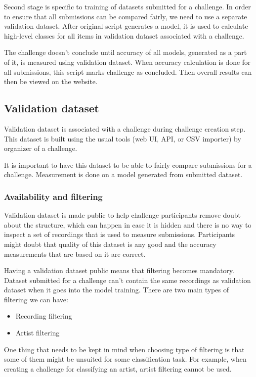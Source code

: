 Second stage is specific to training of datasets submitted for a challenge. In order to ensure that all submissions can be compared fairly, we need to use a separate validation dataset. After original script generates a model, it is used to calculate high-level classes for all items in validation dataset associated with a challenge.

The challenge doesn't conclude until accuracy of all models, generated as a part of it, is measured using validation dataset. When accuracy calculation is done for all submissions, this script marks challenge as concluded. Then overall results can then be viewed on the website.

\subsection{Validation dataset}

Validation dataset is associated with a challenge during challenge creation step. This dataset is built using the usual tools (web UI, API, or CSV importer) by organizer of a challenge.

It is important to have this dataset to be able to fairly compare submissions for a challenge. Measurement is done on a model generated from submitted dataset.

\subsubsection{Availability and filtering}

Validation dataset is made public to help challenge participants remove doubt about the structure, which can happen in case it is hidden and there is no way to inspect a set of recordings that is used to measure submissions. Participants might doubt that quality of this dataset is any good and the accuracy measurements that are based on it are correct.

Having a validation dataset public means that filtering becomes mandatory. Dataset submitted for a challenge can't contain the same recordings as validation dataset when it goes into the model training. There are two main types of filtering we can have:
\begin{itemize}
    \item Recording filtering
    \item Artist filtering
\end{itemize}
One thing that needs to be kept in mind when choosing type of filtering is that some of them might be unsuited for some classification task. For example, when creating a challenge for classifying an artist, artist filtering cannot be used.

